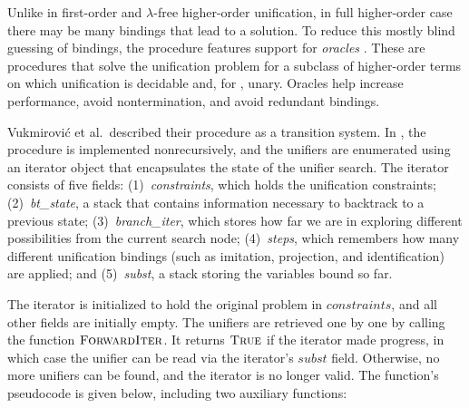 Unlike in first-order and $\lambda$-free higher-order unification,
in full higher-order case there may be many bindings that lead to a solution. To
reduce this mostly blind guessing of bindings, the procedure features support
for \emph{oracles} \cite{unif-section}. These are procedures that
solve the unification problem for a subclass of higher-order terms on which
unification is decidable and, for \ehohii{}, unary. Oracles help
increase performance, avoid nontermination, and avoid redundant bindings.

Vukmirovi\'c et al.\ described their procedure as a transition system. In
\ehohii{}, the procedure is implemented nonrecursively, and the unifiers are
enumerated using an iterator object that encapsulates the state of the unifier
search. The iterator consists of five fields:
(1)~\emph{constraints}, which holds the unification
constraints;
(2)~\emph{bt\_state}, a stack that contains information necessary to backtrack
to a previous state;
(3)~\emph{branch\_iter}, which stores how far we
are in exploring different possibilities from the current search node;
(4)~\emph{steps}, which remembers how many different unification bindings (such as
imitation, projection, and identification) are applied; and
(5)~\emph{subst},
a stack storing the variables bound so far.

\newcommand{\vn}[1]{\ensuremath{\mathit{#1}}} %
\newcommand{\cn}[1]{\ensuremath{\textsc{#1}}} %
\newcommand{\fc}[1]{\ensuremath{\textsc{#1}}} %
\algrenewcommand{}

The iterator is initialized to hold the original problem in \vn{constraints},
and all other fields are initially empty. The unifiers are retrieved one by one by
calling the function \fc{ForwardIter}. It returns \fc{True} if the iterator made
progress, in which case the unifier can be read via the iterator's
$\vn{subst}$ field. Otherwise, no more unifiers can be found, and the iterator is
no longer valid. The function's pseudocode is given below, including two
auxiliary functions:
  
